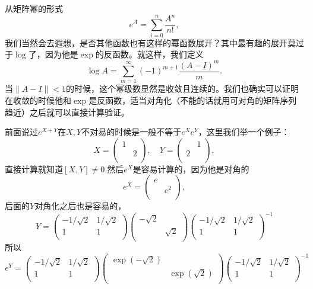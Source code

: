 从矩阵幂的形式
\[
	e^A=\sum_{i=0}^n\frac{A^n}{n!},
\]
我们当然会去遐想，是否其他函数也有这样的幂函数展开？其中最有趣的展开莫过于$\log$了，因为他是$\exp$的反函数。就这样，我们定义
\[
	\log A=\sum_{m=1}^\infty (-1)^{m+1}\frac{(A-I)^m}{m}.
\]
当$\|A-I\|<1$的时候，这个幂级数显然是收敛且连续的。我们也确实可以证明在收敛的时候他和$\exp$是反函数，适当对角化（不能的话就用可对角的矩阵序列趋近）之后就可以直接计算验证。

前面说过$e^{X+Y}$在$X,Y$不对易的时候是一般不等于$e^Xe^Y$，这里我们举一个例子：
\[
X=\begin{pmatrix}
1&\\
&2\\
\end{pmatrix},
\quad
Y=\begin{pmatrix}
&1\\
2&\\
\end{pmatrix},
\]
直接计算就知道$[X,Y]\neq 0$.然后$e^X$是容易计算的，因为他是对角的
\[
e^X=\begin{pmatrix}
e&\\
&e^2\\
\end{pmatrix},
\]
后面的$Y$对角化之后也是容易的，
\[
Y=
\begin{pmatrix}
 -1/\sqrt{2} & 1/\sqrt{2} \\
 1 & 1 \\
\end{pmatrix}
\begin{pmatrix}
 -\sqrt{2} &  \\
  & \sqrt{2} \\
\end{pmatrix}
\begin{pmatrix}
 -1/\sqrt{2} & 1/\sqrt{2} \\
 1 & 1 \\
\end{pmatrix}^{-1}
\]
所以
\[
e^Y=
\begin{pmatrix}
 -1/\sqrt{2} & 1/\sqrt{2} \\
 1 & 1 \\
\end{pmatrix}
\begin{pmatrix}
 \exp(-\sqrt{2}) &  \\
  & \exp(\sqrt{2}) \\
\end{pmatrix}
\begin{pmatrix}
 -1/\sqrt{2} & 1/\sqrt{2} \\
 1 & 1 \\
\end{pmatrix}^{-1}
\]
